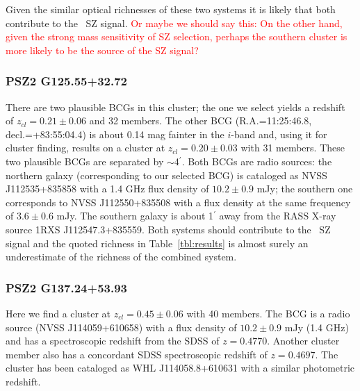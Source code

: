 \documentclass[apj, revtex4-1]{emulateapj}
\newcommand{\editorial}[1]{\textcolor{red}{#1}}
\begin{document}
Given the similar optical richnesses of these two systems it is likely that both contribute to the \planck\ SZ signal. \editorial{Or maybe we should say this: On the other hand, given the strong mass sensitivity of SZ selection, perhaps the southern cluster is more likely to be the source of the SZ signal?}

\subsubsection{PSZ2 G125.55+32.72} %
There are two plausible BCGs in this cluster; the one we select yields a redshift of $z_{cl} = 0.21 \pm 0.06$ and 32 members. The other BCG (R.A.=11:25:46.8, decl.=+83:55:04.4) is about 0.14 mag fainter in the $i$-band and, using it for cluster finding, results on a cluster at $z_{cl} = 0.20 \pm 0.03$ with 31 members. These two plausible BCGs are separated by $\sim$4$^\prime$. Both BCGs are radio sources: the northern galaxy (corresponding to our selected BCG) is cataloged as NVSS J112535+835858 with a 1.4 GHz flux density of $10.2 \pm 0.9$ mJy; the southern one corresponds to NVSS J112550+835508 with a flux density at the same frequency of $3.6 \pm 0.6$ mJy. The southern galaxy is about 1$^\prime$ away from the RASS X-ray source 1RXS J112547.3+835559. Both systems should contribute to the \planck\ SZ signal and the quoted richness in Table~\ref{tbl:results} is almost surely an underestimate of the richness of the combined system.


\subsubsection{PSZ2 G137.24+53.93} %
Here we find a cluster at $z_{cl} = 0.45 \pm 0.06$ with 40 members. The BCG is a radio source (NVSS J114059+610658) with a flux density of $10.2 \pm 0.9$ mJy (1.4 GHz) and has a spectroscopic redshift from the SDSS of $z=0.4770$. Another cluster member also has a concordant SDSS spectroscopic redshift of $z=0.4697$. The cluster has been cataloged as WHL J114058.8+610631 with a similar photometric redshift.
\end{document}
